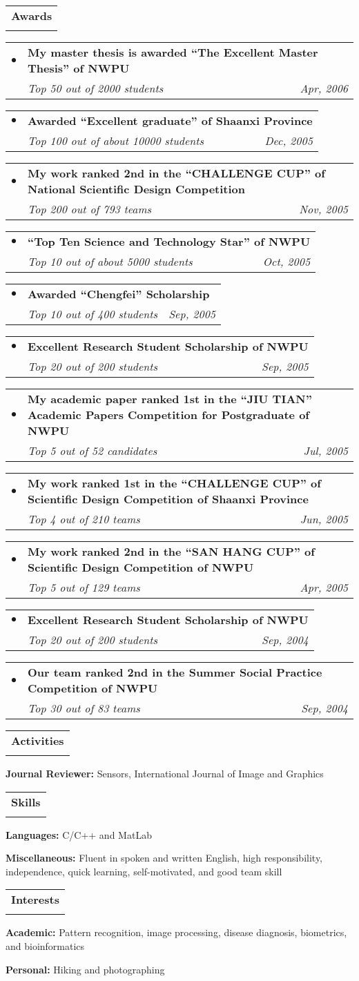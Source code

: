 \documentclass[letterpaper,11pt]{report}
\makeatletter
\newcommand{\resheading}[1]{
\vspace{6pt}\begin{tabular*}{6.71in}{l@{\extracolsep{\fill}}}
        \large {\textbf{#1}} \\
        \Xhline{1.2pt}
\end{tabular*}\vspace{-2pt}}
\newcommand{\ressubheadingthr}[3]{
\begin{tabular*}{6.9in}{llr}
        \hspace{0.15in} $\bullet$ \hspace{0.05in} & \multicolumn{2}{p{6.54in}}{\textbf{#1}} \\
        & \textit{#2} & \textit{#3} \\
\end{tabular*}\vspace{-4pt}}
\makeatother
\begin{document}
\resheading{Awards}
\begin{description}
\item
    \ressubheadingthr{My master thesis is awarded ``The Excellent Master Thesis'' of NWPU}{Top 50 out of 2000 students}{Apr, 2006}
\item
    \ressubheadingthr{Awarded ``Excellent graduate'' of Shaanxi Province}{Top 100 out of about 10000 students}{Dec, 2005}
\item
    \ressubheadingthr{My work ranked 2nd in the ``CHALLENGE CUP'' of National Scientific Design Competition}{Top 200 out of 793 teams}{Nov, 2005}
\item
    \ressubheadingthr{``Top Ten Science and Technology Star'' of NWPU}{Top 10 out of about 5000 students}{Oct, 2005}
\item
    \ressubheadingthr{Awarded ``Chengfei'' Scholarship}{Top 10 out of 400 students}{Sep, 2005}
\item
    \ressubheadingthr{Excellent Research Student Scholarship of NWPU}{Top 20 out of 200 students}{Sep, 2005}
\item
    \ressubheadingthr{My academic paper ranked 1st in the ``JIU TIAN'' Academic Papers Competition for Postgraduate of NWPU}{Top 5 out of 52 candidates}{Jul, 2005}
\item
    \ressubheadingthr{My work ranked 1st in the ``CHALLENGE CUP'' of Scientific Design Competition of Shaanxi Province}{Top 4 out of 210 teams}{Jun, 2005}
\item
    \ressubheadingthr{My work ranked 2nd in the ``SAN HANG CUP'' of Scientific Design Competition of NWPU}{Top 5 out of 129 teams}{Apr, 2005}
\item
    \ressubheadingthr{Excellent Research Student Scholarship of NWPU}{Top 20 out of 200 students}{Sep, 2004}
\item
    \ressubheadingthr{Our team ranked 2nd in the Summer Social Practice Competition of NWPU}{Top 30 out of 83 teams}{Sep, 2004}
\end{description}

\resheading{Activities}
\begin{description}
\item \hspace{0.15in} {\bf{Journal Reviewer:}}
Sensors, International Journal of Image and Graphics
\end{description}

\resheading{Skills}
\begin{description}
\item \hspace{0.15in} {\bf{Languages:}}
C/C++ and MatLab
\item \hspace{0.15in} {\bf{Miscellaneous:}}
Fluent in spoken and written English, high responsibility, independence, quick learning, self-motivated, and good team skill
\end{description}

\resheading{Interests}
\begin{description}
\item \hspace{0.15in} {\bf{Academic:}} Pattern recognition, image processing, disease diagnosis, biometrics, and bioinformatics
\item \hspace{0.15in} {\bf{Personal:}} Hiking and photographing
\end{description}
\end{document}
